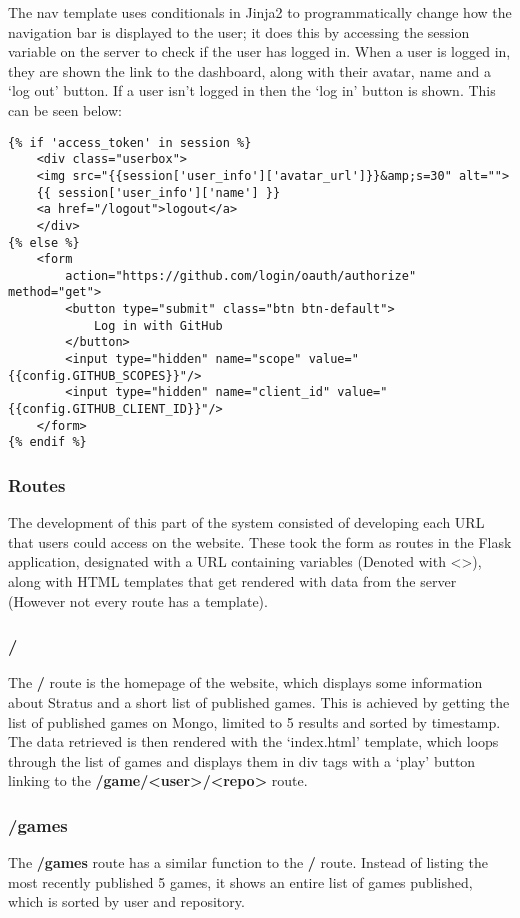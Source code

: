 	The nav template uses conditionals in Jinja2 to programmatically change how the navigation bar is displayed to the user; it does this by accessing the session variable on the server to check if the user has logged in. When a user is logged in, they are shown the link to the dashboard, along with their avatar, name and a `log out' button. If a user isn't logged in then the `log in' button is shown. This can be seen below:

	\begin{lstlisting}
{% if 'access_token' in session %}
	<div class="userbox">
	<img src="{{session['user_info']['avatar_url']}}&amp;s=30" alt="">
	{{ session['user_info']['name'] }} 
	<a href="/logout">logout</a>
	</div>
{% else %}
	<form 
		action="https://github.com/login/oauth/authorize" method="get">
		<button type="submit" class="btn btn-default">
			Log in with GitHub
		</button>
		<input type="hidden" name="scope" value="{{config.GITHUB_SCOPES}}"/>
		<input type="hidden" name="client_id" value="{{config.GITHUB_CLIENT_ID}}"/>
	</form>
{% endif %}
	\end{lstlisting}

	\subsubsection{Routes}
	The development of this part of the system consisted of developing each URL that users could access on the website. These took the form as routes in the Flask application, designated with a URL containing variables (Denoted with <>), along with HTML templates that get rendered with data from the server (However not every route has a template).


	\subsubsection{/}
	The \textbf{/} route is the homepage of the website, which displays some information about Stratus and a short list of published games. This is achieved by getting the list of published games on Mongo, limited to 5 results and sorted by timestamp. The data retrieved is then rendered with the `index.html' template, which loops through the list of games and displays them in div tags with a `play' button linking to the \textbf{/game/<user>/<repo>} route.
	
	\subsubsection{/games}
	The \textbf{/games} route has a similar function to the \textbf{/} route. Instead of listing the most recently published 5 games, it shows an entire list of games published, which is sorted by user and repository.

